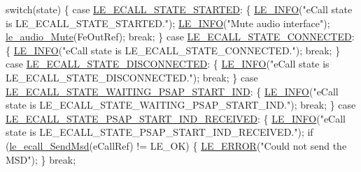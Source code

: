 \begin{DoxyCodeInclude}
{{{{{    \textcolor{keywordflow}{switch}(state)
    \{
        \textcolor{keywordflow}{case} \hyperlink{le__ecall__interface_8h_a233609e4724e549a1405f9177c0a07dda94ba7aacca9dfe74c4733515a7ba2c5e}{LE\_ECALL\_STATE\_STARTED}:
        \{
            \hyperlink{le__log_8h_a23e6d206faa64f612045d688cdde5808}{LE\_INFO}(\textcolor{stringliteral}{"eCall state is LE\_ECALL\_STATE\_STARTED."});
            \hyperlink{le__log_8h_a23e6d206faa64f612045d688cdde5808}{LE\_INFO}(\textcolor{stringliteral}{"Mute audio interface"});
            \hyperlink{le__audio__interface_8h_a147e97c49dbc003f63df78f97d5fca32}{le\_audio\_Mute}(FeOutRef);
            \textcolor{keywordflow}{break};
        \}
        \textcolor{keywordflow}{case} \hyperlink{le__ecall__interface_8h_a233609e4724e549a1405f9177c0a07dda974a4cdcc060be69502b2eae59962a45}{LE\_ECALL\_STATE\_CONNECTED}:
        \{
            \hyperlink{le__log_8h_a23e6d206faa64f612045d688cdde5808}{LE\_INFO}(\textcolor{stringliteral}{"eCall state is LE\_ECALL\_STATE\_CONNECTED."});
            \textcolor{keywordflow}{break};
        \}
        \textcolor{keywordflow}{case} \hyperlink{le__ecall__interface_8h_a233609e4724e549a1405f9177c0a07dda085024eb3cca6b48f024f368c6b0f757}{LE\_ECALL\_STATE\_DISCONNECTED}:
        \{
            \hyperlink{le__log_8h_a23e6d206faa64f612045d688cdde5808}{LE\_INFO}(\textcolor{stringliteral}{"eCall state is LE\_ECALL\_STATE\_DISCONNECTED."});
            \textcolor{keywordflow}{break};
        \}
        \textcolor{keywordflow}{case} \hyperlink{le__ecall__interface_8h_a233609e4724e549a1405f9177c0a07ddafeaa941937f098a5d6cc913f9ee2b32f}{LE\_ECALL\_STATE\_WAITING\_PSAP\_START\_IND}:
        \{
            \hyperlink{le__log_8h_a23e6d206faa64f612045d688cdde5808}{LE\_INFO}(\textcolor{stringliteral}{"eCall state is LE\_ECALL\_STATE\_WAITING\_PSAP\_START\_IND."});
            \textcolor{keywordflow}{break};
        \}
        \textcolor{keywordflow}{case} \hyperlink{le__ecall__interface_8h_a233609e4724e549a1405f9177c0a07dda2660c7eedfd850b845f0ece7899d5454}{LE\_ECALL\_STATE\_PSAP\_START\_IND\_RECEIVED}:
        \{
            \hyperlink{le__log_8h_a23e6d206faa64f612045d688cdde5808}{LE\_INFO}(\textcolor{stringliteral}{"eCall state is LE\_ECALL\_STATE\_PSAP\_START\_IND\_RECEIVED."});
            \textcolor{keywordflow}{if} (\hyperlink{le__ecall__interface_8h_a344e4c29208e576e81dda113f786529e}{le\_ecall\_SendMsd}(eCallRef) != LE\_OK)
            \{
                \hyperlink{le__log_8h_a353590f91b3143a7ba3a416ae5a50c3d}{LE\_ERROR}(\textcolor{stringliteral}{"Could not send the MSD"});
            \}
            \textcolor{keywordflow}{break};
}}}}}
\end{DoxyCodeInclude}
